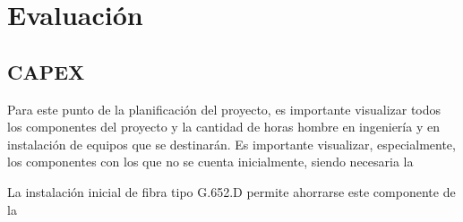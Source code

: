 \section{Evaluaci\'on }\label{sec:evaluacion}

\subsection{CAPEX}

Para este punto de la planificación del proyecto, es importante
visualizar todos los componentes del proyecto y la cantidad de horas
hombre en ingeniería y en instalación de equipos que se destinarán. Es
importante visualizar, especialmente, los componentes con los que no
se cuenta inicialmente, siendo necesaria la 

La instalación inicial de fibra tipo G.652.D permite ahorrarse este componente de la 


 
 
 

